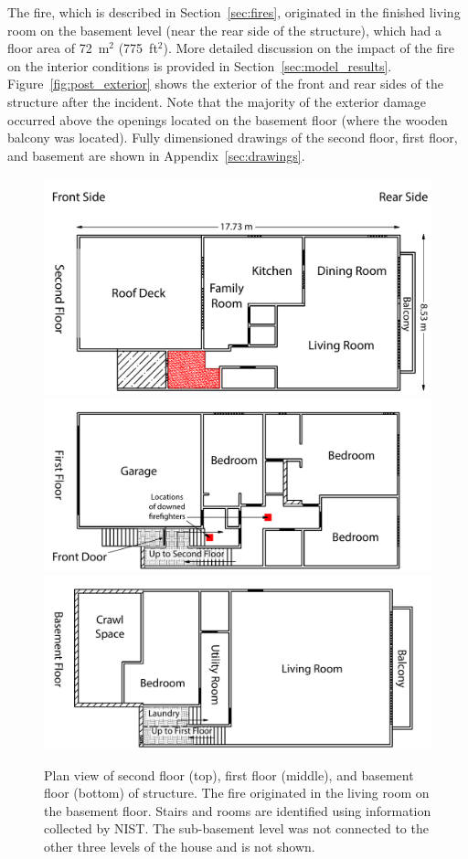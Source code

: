 \documentclass[12pt,oneside]{book}
\begin{document}
The fire, which is described in Section~\ref{sec:fires}, originated in the finished living room on the basement level (near the rear side of the structure), which had a floor area of 72~m$^2$ (775~ft$^2$). More detailed discussion on the impact of the fire on the interior conditions is provided in Section~\ref{sec:model_results}. Figure~\ref{fig:post_exterior} shows the exterior of the front and rear sides of the structure after the incident. Note that the majority of the exterior damage occurred above the openings located on the basement floor (where the wooden balcony was located). Fully dimensioned drawings of the second floor, first floor, and basement are shown in Appendix~\ref{sec:drawings}.


\clearpage


\begin{figure}[!ht]
\includegraphics[width=5.0in]{../Figures/Plan_Second_Floor}
\includegraphics[width=5.0in]{../Figures/Plan_First_Floor}
\includegraphics[width=5.0in]{../Figures/Plan_Basement_Floor}
\caption[Plan view of second floor, first floor, and basement floor of structure.]
{Plan view of second floor (top), first floor (middle), and basement floor (bottom) of structure. The fire originated in the living room on the basement floor. Stairs and rooms are identified using information collected by NIST. The sub-basement level was not connected to the other three levels of the house and is not shown.}
\label{fig:floor_plan}
\end{figure}
\end{document}

